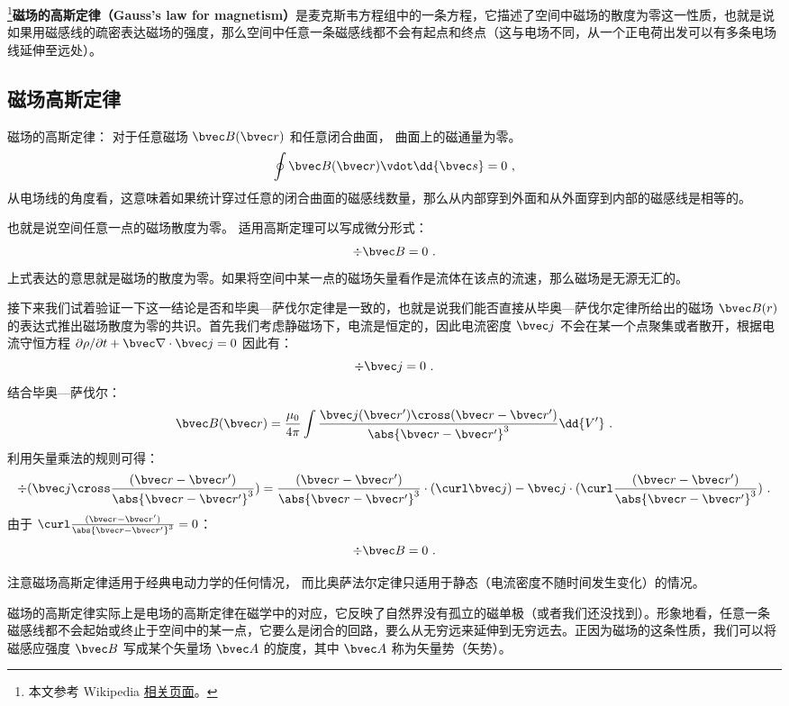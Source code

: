 
\begin{issues}
\issueDraft
\end{issues}


\footnote{本文参考 Wikipedia \href{https://en.wikipedia.org/wiki/Gauss's_law_for_magnetism}{相关页面}。}\textbf{磁场的高斯定律（Gauss's law for magnetism）}是麦克斯韦方程组中的一条方程，它描述了空间中磁场的散度为零这一性质，也就是说如果用磁感线的疏密表达磁场的强度，那么空间中任意一条磁感线都不会有起点和终点（这与电场不同，从一个正电荷出发可以有多条电场线延伸至远处）。

\subsection{磁场高斯定律}
磁场的高斯定律： 对于任意磁场 $\bvec B(\bvec r)$ 和任意闭合曲面， 曲面上的磁通量为零。
\begin{equation}
\oint \bvec B(\bvec r) \vdot \dd{\bvec s} = 0~,
\end{equation}
从电场线的角度看，这意味着如果统计穿过任意的闭合曲面的磁感线数量，那么从内部穿到外面和从外面穿到内部的磁感线是相等的。

也就是说空间任意一点的磁场散度为零。 适用高斯定理可以写成微分形式：
\begin{equation}
\div\bvec B = 0~.
\end{equation}
上式表达的意思就是磁场的散度为零。如果将空间中某一点的磁场矢量看作是流体在该点的流速，那么磁场是无源无汇的。

接下来我们试着验证一下这一结论是否和毕奥—萨伐尔定律是一致的，也就是说我们能否直接从毕奥—萨伐尔定律所给出的磁场 $\bvec B(r)$ 的表达式推出磁场散度为零的共识。首先我们考虑静磁场下，电流是恒定的，因此电流密度 $\bvec j$ 不会在某一个点聚集或者散开，根据电流守恒方程 $\partial \rho/\partial t + \bvec \nabla\cdot \bvec j=0$ 因此有：
\begin{equation}
\div \bvec j = 0  ~.
\end{equation}
结合毕奥—萨伐尔：
\begin{equation}
\bvec B(\bvec r) = \frac{\mu_0}{4\pi} \int \frac{\bvec j(\bvec r') \cross (\bvec r - \bvec r')}{\abs{\bvec r - \bvec r'}^3} \dd{V'}~.
\end{equation}
利用矢量乘法的规则可得：
\begin{equation}
\div(\bvec j \cross \frac{(\bvec r - \bvec r')}{\abs{\bvec r - \bvec r'}^3})=\frac{(\bvec r - \bvec r')}{\abs{\bvec r - \bvec r'}^3}\cdot(\curl \bvec j)-\bvec j\cdot(\curl \frac{(\bvec r - \bvec r')}{\abs{\bvec r - \bvec r'}^3})~.
\end{equation}
由于 $\curl \frac{(\bvec r - \bvec r')}{\abs{\bvec r - \bvec r'}^3} = 0$：
\begin{equation}
\div \bvec B = 0  ~.
\end{equation}

注意磁场高斯定律适用于经典电动力学的任何情况， 而比奥萨法尔定律只适用于静态（电流密度不随时间发生变化）的情况。

磁场的高斯定律实际上是电场的高斯定律在磁学中的对应，它反映了自然界没有孤立的磁单极（或者我们还没找到）。形象地看，任意一条磁感线都不会起始或终止于空间中的某一点，它要么是闭合的回路，要么从无穷远来延伸到无穷远去。正因为磁场的这条性质，我们可以将磁感应强度 $\bvec B$ 写成某个矢量场 $\bvec A$ 的旋度，其中 $\bvec A$ 称为矢量势（矢势）。
